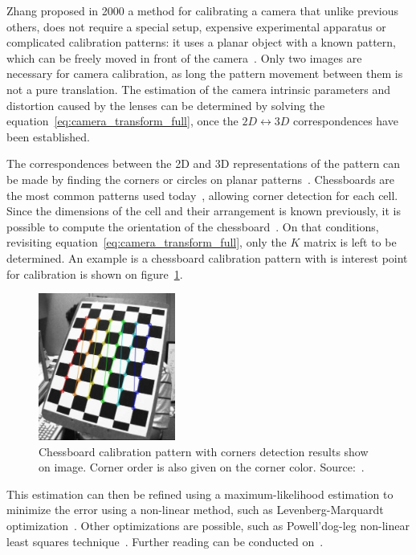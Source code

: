 Zhang proposed in 2000 a method for calibrating a camera that unlike previous others\citeneeded, does not require a special setup, expensive experimental apparatus or complicated calibration patterns: it uses a planar object with a known pattern, which can be freely moved in front of the camera~\cite{Zhang2000}. Only two images are necessary for camera calibration, as long the pattern movement between them is not a pure translation. The estimation of the camera intrinsic parameters and distortion caused by the lenses can be determined by solving the equation~\ref{eq:camera_transform_full}, once the $2D \leftrightarrow 3D$ correspondences have been established.

The correspondences between the 2D and 3D representations of the pattern can be made by finding the corners or circles on planar patterns~\cite{opencv, mvg_book}. Chessboards are the most common patterns used today~\cite{opencv}, allowing corner detection for each cell. Since the dimensions of the cell and their arrangement is known previously, it is possible to compute the orientation of the chessboard~\cite{Zhang2000, opencv_doc, mvg_book}. On that conditions, revisiting equation~\ref{eq:camera_transform_full}, only the $K$ matrix is left to be determined. An example is a chessboard calibration pattern with is interest point for calibration is shown on figure~\ref{fig:opencv_calib_pattern}.

\begin{figure}
	\centering
	\includegraphics[width=0.4\textwidth, keepaspectratio]{img/camera/calib_pattern.jpg}
	\caption{Chessboard calibration pattern with corners detection results show on image. Corner order is also given on the corner color. Source:~\cite{OpenCV_camera_calib}.}
	\label{fig:opencv_calib_pattern}
\end{figure}

This estimation can then be refined using a maximum-likelihood estimation to minimize the error using a non-linear method, such as Levenberg-Marquardt optimization~\cite{Levenberg1943}. Other optimizations are possible, such as Powell’dog-leg non-linear least squares technique~\cite{Lourakis2005}. Further reading can be conducted on~\cite{mvg_book, Sturm2010, camera_models, Hata, Xu1996a}.

